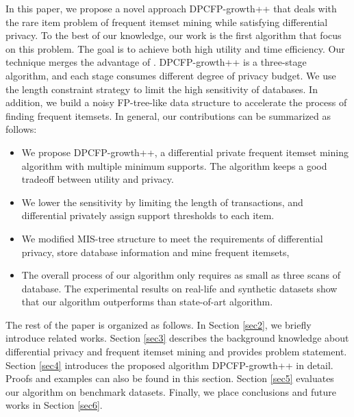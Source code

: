 \documentclass[conference]{IEEEtran}
\begin{document}
In this paper, we propose a novel approach DPCFP-growth++ that deals with the rare item problem of frequent itemset mining while satisfying differential privacy. 
To the best of our knowledge, our work is the first algorithm that focus on this problem.
The goal is to achieve both high utility and time efficiency.
Our technique merges the advantage of \cite{b4}\cite{b6}\cite{b8}. 
DPCFP-growth++ is a three-stage algorithm, and each stage consumes different degree of privacy budget.
We use the length constraint strategy to limit the high sensitivity of databases.
In addition, we build a noisy FP-tree-like data structure to accelerate the process of finding frequent itemsets. 
In general, our contributions can be summarized as follows:
\begin{itemize}
    \item We propose DPCFP-growth++, a differential private frequent itemset mining algorithm with multiple minimum supports. 
    The algorithm keeps a good tradeoff between utility and privacy.
    \item We lower the sensitivity by limiting the length of transactions, and differential privately assign support thresholds to each item. 
    \item We modified MIS-tree structure to meet the requirements of differential privacy, store database information and mine frequent itemsets, 
    \item  The overall process of our algorithm only requires as small as three scans of database.
    The experimental results on real-life and synthetic datasets show that our algorithm outperforms than state-of-art algorithm.
\end{itemize}

The rest of the paper is organized as follows.
In Section \ref{sec2}, we briefly introduce related works. 
Section \ref{sec3} describes the background knowledge about differential privacy and frequent itemset mining and provides problem statement.
Section \ref{sec4} introduces the proposed algorithm DPCFP-growth++ in detail. Proofs and examples can also be found in this section.
Section \ref{sec5} evaluates our algorithm on benchmark datasets. 
Finally, we place conclusions and future works in Section \ref{sec6}.
\end{document}

